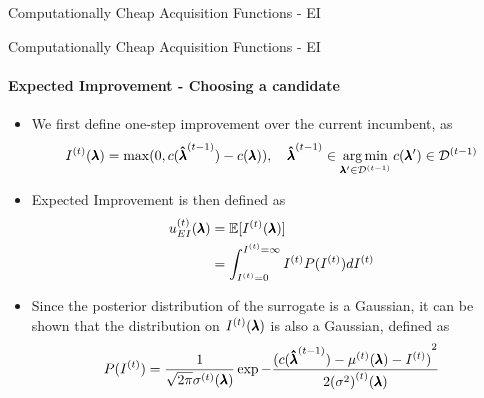 \begin{frame}[t]{Computationally Cheap Acquisition Functions - EI}
\begin{figure}
\end{figure}

\end{frame}
\begin{frame}[c]{Computationally Cheap Acquisition Functions - EI}
\framesubtitle{Expected Improvement - Choosing a candidate}
    \begin{itemize}\abovedisplayskip=0pt\belowdisplayskip=-0.5em
        \item[] We first define one-step improvement over the current incumbent, as
        \smallskip
        \[
            \iter{I}(\conf) = \max(0, \cost(\incumbent[\bocount-1]) - \cost(\conf)), \quad\incumbent[\bocount-1]\in\argmin_{\conf'\in\iter[\bocount-1]{\dataset}}\obs[\conf']\in\iter[\bocount-1]{\dataset}
        \]
        \pause
        \medskip
        \item[] Expected Improvement is then defined as
        \begin{align*}
            \iter{\acq}_{EI}(\conf) &= \E[\iter{I}(\conf)]\\
            &= \int_{\iter{I}=0}^{\iter{I}=\infty}\iter{I} P(\iter{I})d\iter{I}
        \end{align*}
        \pause
        \medskip
        \item[]Since the posterior distribution of the surrogate is a Gaussian, it can be shown that the distribution on $\iter{I}(\conf)$ is also a Gaussian, defined as
        \[
            P(\iter{I}) =
                \dfrac{1}{\sqrt{2\pi}\iter{\stddev}(\conf)}\exp{-\dfrac{{(\cost(\incumbent[\bocount-1])-\iter{\mean}(\conf)-\iter{I})}^2}{2\iter{\left(\variance\right)}(\conf)}
            }
        \]
    \end{itemize}
\end{frame}

